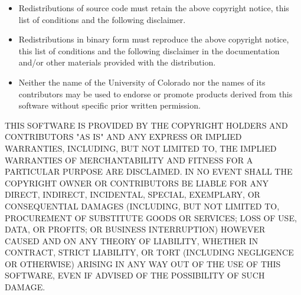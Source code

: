 \documentclass[a4paper,12pt]{article}
\begin{document}
\begin{itemize}
\item
Redistributions of source code must retain the above copyright
notice, this list of conditions and the following disclaimer.
\item
Redistributions in binary form must reproduce the above copyright
notice, this list of conditions and the following disclaimer in the
documentation and/or other materials provided with the distribution.
\item
Neither the name of the University of Colorado nor the names of its
contributors may be used to endorse or promote products derived from
this software without specific prior written permission.
\end{itemize}
THIS SOFTWARE IS PROVIDED BY THE COPYRIGHT HOLDERS AND CONTRIBUTORS
"AS IS" AND ANY EXPRESS OR IMPLIED WARRANTIES, INCLUDING, BUT NOT
LIMITED TO, THE IMPLIED WARRANTIES OF MERCHANTABILITY AND FITNESS
FOR A PARTICULAR PURPOSE ARE DISCLAIMED. IN NO EVENT SHALL THE
COPYRIGHT OWNER OR CONTRIBUTORS BE LIABLE FOR ANY DIRECT, INDIRECT,
INCIDENTAL, SPECIAL, EXEMPLARY, OR CONSEQUENTIAL DAMAGES (INCLUDING,
BUT NOT LIMITED TO, PROCUREMENT OF SUBSTITUTE GOODS OR SERVICES;
LOSS OF USE, DATA, OR PROFITS; OR BUSINESS INTERRUPTION) HOWEVER
CAUSED AND ON ANY THEORY OF LIABILITY, WHETHER IN CONTRACT, STRICT
LIABILITY, OR TORT (INCLUDING NEGLIGENCE OR OTHERWISE) ARISING IN
ANY WAY OUT OF THE USE OF THIS SOFTWARE, EVEN IF ADVISED OF THE
POSSIBILITY OF SUCH DAMAGE.




\end{document}
